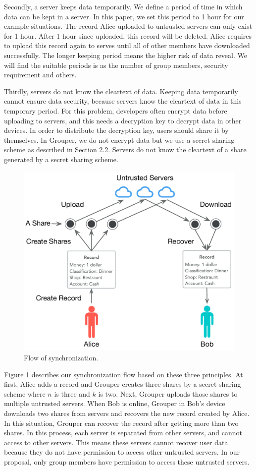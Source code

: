 \documentclass[twocolumn,10pt]{article}
\begin{document}
Secondly, a server keeps data temporarily. We define a period of time in which data can be kept in a server. In this paper, we set this period to 1 hour for our example situations. The record Alice uploaded to untrusted servers can only exist for 1 hour. After 1 hour since uploaded, this record will be deleted. Alice requires to upload this record again to serves until all of other members have downloaded successfully. The longer keeping period means the higher risk of data reveal. We will find the suitable periods is as the number of group members, security requirement and others. 

Thirdly, servers do not know the cleartext of data. Keeping data temporarily cannot ensure data security, because servers know the cleartext of data in this temporary period. For this problem, developers often encrypt data before uploading to servers, and this needs a decryption key to decrypt data in other devices. In order to distribute the decryption key, users should share it by themselves. In Grouper, we do not encrypt data but we use a secret sharing scheme as described in Section 2.2. Servers do not know the cleartext of a share generated by a secret sharing scheme.

\begin{figure}[t]
\centering
\includegraphics[scale=0.38]{sync_flow}
\caption{Flow of synchronization.}
\end{figure}

Figure 1 describes our synchronization flow based on these three principles. At first, Alice adds a record and Grouper creates three shares by a secret sharing scheme where $n$ is three and $k$ is two. Next, Grouper uploads those shares to multiple untrusted servers. When Bob is online, Grouper in Bob's device downloads two shares from servers and recovers the new record created by Alice. In this situation, Grouper can recover the record after getting more than two shares. In this process, each server is separated from other servers, and cannot access to other servers. This means these servers cannot recover user data because they do not have permission to access other untrusted servers. In our proposal, only group members have permission to access these untrusted servers.
\end{document}
